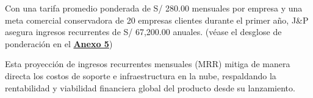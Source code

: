 Con una tarifa promedio ponderada de S/ 280.00 mensuales por empresa 
y una meta comercial conservadora de 20 empresas clientes durante el primer año, 
J\&P asegura ingresos recurrentes de S/ 67,200.00 anuales. 
(véase el desglose de ponderación en el \textbf{\hyperref[tab:anexo_proyeccion_saas]{Anexo 5}})

Esta proyección de ingresos recurrentes mensuales (MRR) mitiga de manera directa los costos de soporte e infraestructura en la nube, 
respaldando la rentabilidad y viabilidad financiera global del producto desde su lanzamiento.
